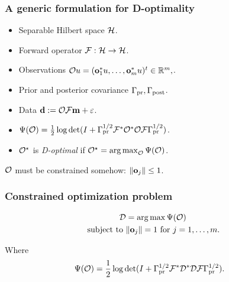 \documentclass{beamer}
\begin{document}
\begin{frame}
\frametitle{A generic formulation for D-optimality}

\begin{itemize}
\item Separable Hilbert space \(\mathcal{H}\).
\item Forward operator \(\mathcal{F}: \mathcal{H} \to \mathcal{H}\).
\item Observations \(\mathcal{O} u = (\mathbf{o}_1^*u, \dots, \mathbf{o}_m^*u )^t \in \mathbb{R}^m,\).
\item Prior and posterior covariance \( \Gamma_{\textup{pr}}, \Gamma_{\textup{post}}\).
\item Data \(\mathbf{d} := \mathcal{O} \mathcal{F} \mathbf{m} + \varepsilon\).
\item \(\Psi( \mathcal{O}) = \frac12 \log \det ( I + 
  \Gamma_{\textup{pr}}^{1/2} \mathcal{F} ^* \mathcal{O}^* \mathcal{O} \mathcal{F} \Gamma_{\textup{pr}}^{1/2})\).
\item \(\mathcal{O}^{\star}\) is \emph{D-optimal} if \(\mathcal{O}^{\star} =
  \operatorname*{arg\,max}_{\mathcal{O}} \Psi(\mathcal{O})\).
\end{itemize}

\(\mathcal{O}\) must be constrained somehow: \(\|\mathbf{o}_j\| \leq 1\).


\end{frame}

\begin{frame}
\frametitle{Constrained optimization problem}
\begin{align*}
  \begin{split}
  \mathcal{D} &= \operatorname*{arg\,max}\Psi(\mathcal{O})\\
  \text{subject to }& \|\mathbf{o}_j\| = 1 \text{ for } j=1,\dots,m.
  \end{split}
\end{align*}

Where
\begin{align*}
  \begin{split}
    \tar(\obs) %
    &= \frac12 \log \det ( I + \prcov^{1/2} \fwd ^* \opt^* \opt \fwd
    \prcov^{1/2}).
  \end{split}
\end{align*}
\end{frame}
\end{document}
